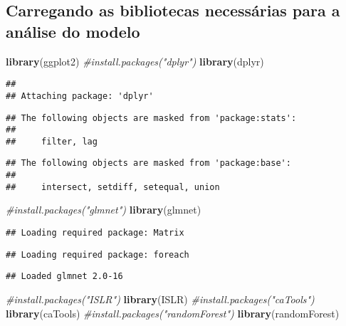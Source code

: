 \documentclass[]{article}
\title{}
\author{}
\date{}
\newenvironment{Shaded}{\begin{snugshade}}{\end{snugshade}}
\newcommand{\KeywordTok}[1]{\textcolor[rgb]{0.13,0.29,0.53}{\textbf{#1}}}
\newcommand{\CommentTok}[1]{\textcolor[rgb]{0.56,0.35,0.01}{\textit{#1}}}
\newcommand{\NormalTok}[1]{#1}
\begin{document}
\subsection{Carregando as bibliotecas necessárias para a análise do
modelo}\label{carregando-as-bibliotecas-necessarias-para-a-analise-do-modelo}

\begin{Shaded}
\begin{Highlighting}[]
\KeywordTok{library}\NormalTok{(ggplot2)}
\CommentTok{#install.packages("dplyr")}
\KeywordTok{library}\NormalTok{(dplyr)}
\end{Highlighting}
\end{Shaded}

\begin{verbatim}
## 
## Attaching package: 'dplyr'
\end{verbatim}

\begin{verbatim}
## The following objects are masked from 'package:stats':
## 
##     filter, lag
\end{verbatim}

\begin{verbatim}
## The following objects are masked from 'package:base':
## 
##     intersect, setdiff, setequal, union
\end{verbatim}

\begin{Shaded}
\begin{Highlighting}[]
\CommentTok{#install.packages("glmnet")}
\KeywordTok{library}\NormalTok{(glmnet)}
\end{Highlighting}
\end{Shaded}

\begin{verbatim}
## Loading required package: Matrix
\end{verbatim}

\begin{verbatim}
## Loading required package: foreach
\end{verbatim}

\begin{verbatim}
## Loaded glmnet 2.0-16
\end{verbatim}

\begin{Shaded}
\begin{Highlighting}[]
\CommentTok{#install.packages("ISLR")}
\KeywordTok{library}\NormalTok{(ISLR)}
\CommentTok{#install.packages("caTools")}
\KeywordTok{library}\NormalTok{(caTools)}
\CommentTok{#install.packages("randomForest")}
\KeywordTok{library}\NormalTok{(randomForest)}
\end{Highlighting}
\end{Shaded}
\end{document}
